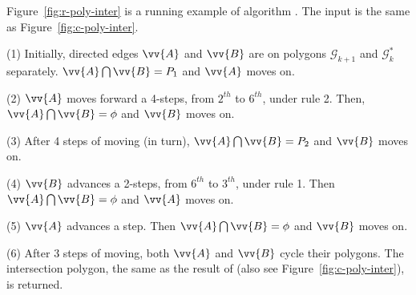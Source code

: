 \begin{example}
Figure~\ref{fig:r-poly-inter} is a running example of algorithm \rpia. The input is the same as Figure~\ref{fig:c-poly-inter}.

\ni (1) Initially, directed edges $\vv{A}$ and $\vv{B}$ are on polygons $\mathcal{G}_{k+1}$ and $\mathcal{G}^*_{k}$ separately. $\vv{A} \bigcap \vv{B} = P_1$ and $\vv{A}$ moves on.

\ni (2) $\vv{A}$ moves forward a 4-steps, from $2^{th}$ to $6^{th}$, under rule 2. Then, $\vv{A} \bigcap \vv{B} = \phi$ and $\vv{B}$ moves on.

\ni (3) After 4 steps of moving (in turn), $\vv{A} \bigcap \vv{B} = P_2$ and $\vv{B}$ moves on.

\ni (4) $\vv{B}$ advances a 2-steps, from $6^{th}$ to $3^{th}$, under rule 1. Then $\vv{A} \bigcap \vv{B} = \phi$ and $\vv{A}$ moves on.

\ni (5) $\vv{A}$ advances a step. Then $\vv{A} \bigcap \vv{B} = \phi$ and $\vv{B}$ moves on.

\ni (6) After 3 steps of moving, both $\vv{A}$ and $\vv{B}$ cycle their polygons. The intersection polygon, the same as the result of \cpia (also see Figure~\ref{fig:c-poly-inter}), is returned.
\end{example}




